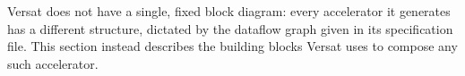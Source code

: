 %

Versat does not have a single, fixed block diagram: every accelerator it
generates has a different structure, dictated by the dataflow graph given
in its specification file. This section instead describes the building
blocks Versat uses to compose any such accelerator.




